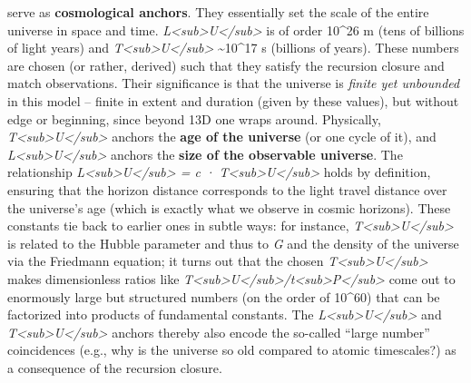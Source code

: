 \begin{itemize}
  serve as \textbf{cosmological anchors}. They essentially set the scale
  of the entire universe in space and time.
  \emph{L\textless{}sub\textgreater{}U\textless{}/sub\textgreater{}} is
  of order 10\^{}26 m (tens of billions of light years) and
  \emph{T\textless{}sub\textgreater{}U\textless{}/sub\textgreater{}}
  \textasciitilde{}10\^{}17 s (billions of years). These numbers are
  chosen (or rather, derived) such that they satisfy the recursion
  closure and match observations. Their significance is that the
  universe is \emph{finite yet unbounded} in this model -- finite in
  extent and duration (given by these values), but without edge or
  beginning, since beyond 13D one wraps around. Physically,
  \emph{T\textless{}sub\textgreater{}U\textless{}/sub\textgreater{}}
  anchors the \textbf{age of the universe} (or one cycle of it), and
  \emph{L\textless{}sub\textgreater{}U\textless{}/sub\textgreater{}}
  anchors the \textbf{size of the observable universe}. The relationship
  \emph{L\textless{}sub\textgreater{}U\textless{}/sub\textgreater{} = c
  · T\textless{}sub\textgreater{}U\textless{}/sub\textgreater{}} holds
  by definition​, ensuring that the horizon distance corresponds to the
  light travel distance over the universe's age (which is exactly what
  we observe in cosmic horizons). These constants tie back to earlier
  ones in subtle ways: for instance,
  \emph{T\textless{}sub\textgreater{}U\textless{}/sub\textgreater{}} is
  related to the Hubble parameter and thus to \emph{G} and the density
  of the universe via the Friedmann equation​; it turns out that the
  chosen
  \emph{T\textless{}sub\textgreater{}U\textless{}/sub\textgreater{}}
  makes dimensionless ratios like
  \emph{T\textless{}sub\textgreater{}U\textless{}/sub\textgreater{}/t\textless{}sub\textgreater{}P\textless{}/sub\textgreater{}}
  come out to enormously large but structured numbers (on the order of
  10\^{}60) that can be factorized into products of fundamental
  constants. The
  \emph{L\textless{}sub\textgreater{}U\textless{}/sub\textgreater{}} and
  \emph{T\textless{}sub\textgreater{}U\textless{}/sub\textgreater{}}
  anchors thereby also encode the so-called ``large number''
  coincidences (e.g., why is the universe so old compared to atomic
  timescales?) as a consequence of the recursion closure.
\end{itemize}


